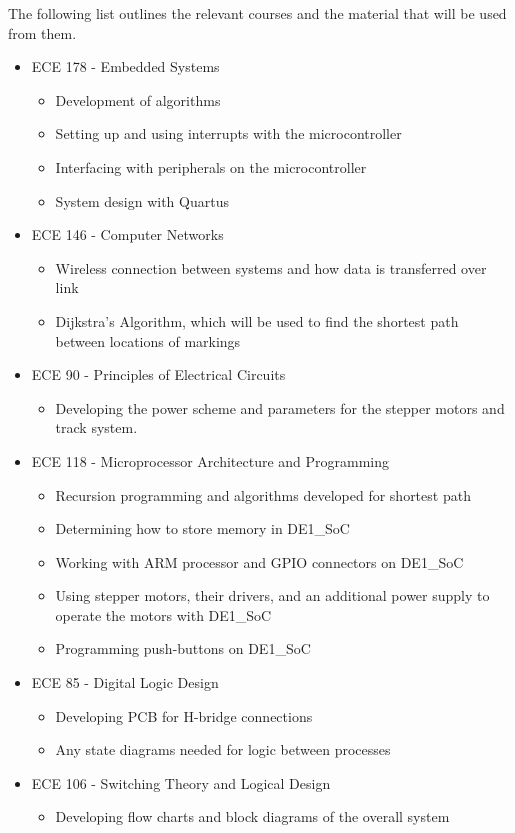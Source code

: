 The following list outlines the relevant courses and the material that will be used from them. \\
\begin{itemize}
	\item ECE 178 - Embedded Systems
	\begin{itemize}
		\item Development of algorithms 
		\item Setting up and using interrupts with the microcontroller
		\item Interfacing with peripherals on the microcontroller
		\item System design with Quartus
	\end{itemize}
	\item ECE 146 - Computer Networks
	\begin{itemize}
		\item Wireless connection between systems and how data is transferred over link
		\item Dijkstra’s Algorithm, which will be used to find the shortest path between locations of markings
	\end{itemize}
	\item ECE 90 - Principles of Electrical Circuits
	\begin{itemize}
		\item Developing the power scheme and parameters for the stepper motors and track system.
		\end{itemize}
	\item ECE 118 - Microprocessor Architecture and Programming
	\begin{itemize}
		\item Recursion programming and algorithms developed for shortest path 
		\item Determining how to store memory in DE1\_SoC 
		\item Working with ARM processor and GPIO connectors on DE1\_SoC 
		\item Using stepper motors, their drivers, and an additional power supply to operate the motors with DE1\_SoC
		\item Programming push-buttons on DE1\_SoC
	\end{itemize}
	\item ECE 85 - Digital Logic Design
	\begin{itemize}
		\item Developing PCB for H-bridge connections 
		\item Any state diagrams needed for logic between processes
	\end{itemize}
	\item ECE 106 - Switching Theory and Logical Design
	\begin{itemize}
		\item Developing flow charts and block diagrams of the overall system \\
	\end{itemize}
\end{itemize}\par

